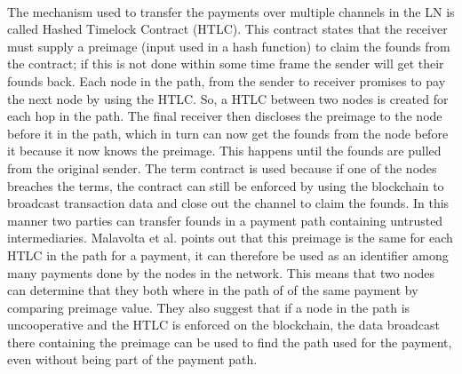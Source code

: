 \paragraph{}
The mechanism used to transfer the payments over multiple channels in the LN is called Hashed Timelock Contract (HTLC). This contract states that the receiver must supply a preimage (input used in a hash function) to claim the founds from the contract; if this is not done within some time frame the sender will get their founds back. Each node in the path, from the sender to receiver promises to pay the next node by using the HTLC. So, a HTLC between two nodes is created for each hop in the path. The final receiver then discloses the preimage to the node before it in the path, which in turn can now get the founds from the node before it because it now knows the preimage.  This happens until the founds are pulled from the original sender. The term contract is used because if one of the nodes breaches the terms, the contract can still be enforced by using the blockchain to broadcast transaction data and close out the channel to claim the founds. In this manner two parties can transfer founds in a payment path containing untrusted intermediaries. Malavolta et al. \cite{malavolta2017concurrency} points out that this preimage is the same for each HTLC in the path for a payment, it can therefore be used as an identifier among many payments done by the nodes in the network. This means that two nodes can determine that they both where in the path of of the same payment by comparing preimage value. They also suggest that if a node in the path is uncooperative and the HTLC is enforced on the blockchain, the data broadcast there containing the preimage can be used to find the path used for the payment, even without being part of the payment path.